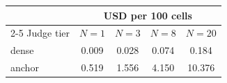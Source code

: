 \begin{tabular*}{\linewidth}{@{\extracolsep{\fill}}lcccc}
  \toprule
  & \multicolumn{4}{c}{USD per 100 cells} \\
  \cmidrule(lr){2-5}
  Judge tier & $N{=}1$ & $N{=}3$ & $N{=}8$ & $N{=}20$ \\
  \midrule
  dense & 0.009 & 0.028 & 0.074 & 0.184 \\
  anchor & 0.519 & 1.556 & 4.150 & 10.376 \\
  \bottomrule
\end{tabular*}
